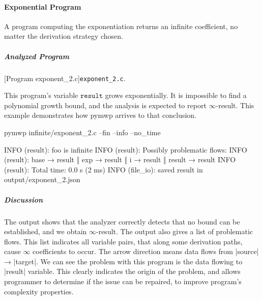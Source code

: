 \paragraph{Exponential Program}\label{exponential-program}
A program computing the exponentiation returns an infinite coefficient, no matter the derivation strategy chosen.

\subparagraph*{Analyzed Program}

\begin{center}
\begin{minipage}{\textwidth}
\captionsetup{type=lstlisting}
[Program exponent\_2.c]{\texttt{exponent\_2.c}.}
\label{lst:exponent2}
\end{minipage}
\end{center}

This program's variable \(\texttt{result}\) grows exponentially.
It is impossible to find a polynomial growth bound, and the analysis is expected to report \(\infty\)-result.
This example demonstrates how pymwp arrives to that conclusion.

\begin{center}
\begin{minipage}{\textwidth}
\begin{cmdlisting}[label={lst:ex2-run-cmd}]
pymwp infinite/exponent_2.c --fin --info --no_time
\end{cmdlisting}
\end{minipage}
\end{center}

\begin{center}
\begin{minipage}{\textwidth}
\begin{outlisting}[label={lst:ex2-output}]
INFO (result): foo is infinite
INFO (result): Possibly problematic flows:
INFO (result): base → result ‖ exp → result ‖ i → result ‖ result → result
INFO (result): Total time: 0.0 s (2 ms)
INFO (file_io): saved result in output/exponent_2.json
\end{outlisting}
\end{minipage}
\end{center}


\subparagraph*{Discussion}
The output shows that the analyzer correctly detects that no bound can
be established, and we obtain \(\infty\)-result.
The output also gives a list of problematic flows.
This list indicates all variable pairs, that along some derivation paths, cause \(\infty\) coefficients to occur.
The arrow direction means data flows from \pr|source| → \pr|target|.
We can see the problem with this program is the data flowing to \pr|result| variable.
This clearly indicates the origin of the problem, and allows programmer to determine if the issue can be
repaired, to improve program's complexity properties.

